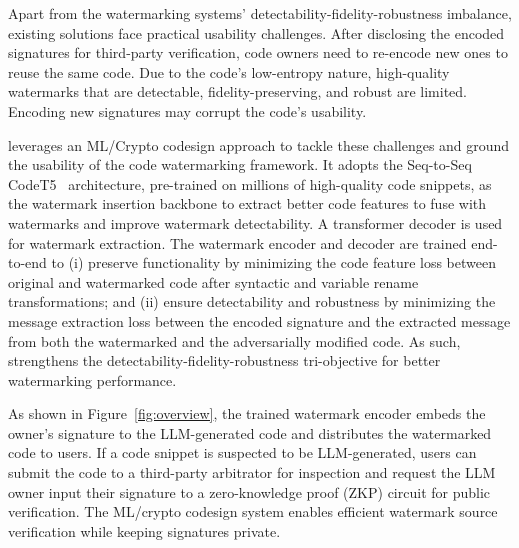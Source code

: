 
Apart from the watermarking systems' detectability-fidelity-robustness imbalance, existing solutions face practical usability challenges. After disclosing the encoded signatures for third-party verification, code owners need to re-encode new ones to reuse the same code. Due to the code's low-entropy nature, high-quality watermarks that are detectable, fidelity-preserving, and robust are limited. Encoding new signatures may corrupt the code's usability. 




\sys{} leverages an ML/Crypto codesign approach to tackle these challenges and ground the usability of the code watermarking framework. 
It adopts the Seq-to-Seq CodeT5~\cite{wang2021codet5} architecture, pre-trained on millions of high-quality code snippets, as the watermark insertion backbone to extract better code features to fuse with watermarks and improve watermark detectability. A transformer decoder is used for watermark extraction. The watermark encoder and decoder are trained end-to-end to (i) preserve functionality by minimizing the code feature loss between original and watermarked code after syntactic and variable rename transformations; and (ii) ensure detectability and robustness by minimizing the message extraction loss between the encoded signature and the extracted message from both the watermarked and the adversarially modified code.  As such, \sys{} strengthens the detectability-fidelity-robustness tri-objective for better watermarking performance. 


As shown in Figure~\ref{fig:overview}, the trained watermark encoder embeds the owner's signature to the LLM-generated code and distributes the watermarked code to users. If a code snippet is suspected to be LLM-generated, users can submit the code to a third-party arbitrator for  inspection and request the LLM owner input their signature to a zero-knowledge
proof (ZKP) circuit for public verification. The ML/crypto codesign system enables efficient watermark source verification while keeping signatures private.

